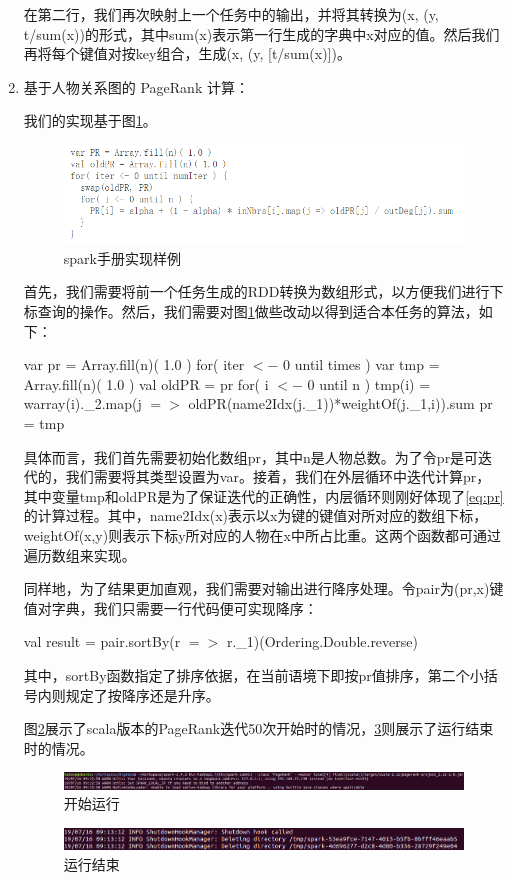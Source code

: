 \documentclass[a4paper,UTF8]{article}
\numberwithin{equation}{section}
\begin{document}
\begin{enumerate}[ {(}1{)}]
		在第二行，我们再次映射上一个任务中的输出，并将其转换为(x, (y, t/sum(x))的形式，其中sum(x)表示第一行生成的字典中x对应的值。然后我们再将每个键值对按key组合，生成(x, (y, [t/sum(x)])。
		\item 基于人物关系图的 PageRank 计算：
		
		我们的实现基于图\ref{fig:code}。
		\begin{figure}
			\centering
			\includegraphics[width=0.7\linewidth]{graph/STask4Code}
			\caption[6]{spark手册实现样例}
			\label{fig:code}
		\end{figure}
		首先，我们需要将前一个任务生成的RDD转换为数组形式，以方便我们进行下标查询的操作。然后，我们需要对图\ref{fig:code}做些改动以得到适合本任务的算法，如下：
		\begin{center}
			var pr = Array.fill(n)( 1.0 )
			for( iter $<-$ 0 until times ) {
				var tmp = Array.fill(n)( 1.0 )
				val oldPR = pr
				for( i $<-$ 0 until n ) 
					tmp(i) = warray(i).\_2.map(j $=>$ oldPR(name2Idx(j.\_1))*weightOf(j.\_1,i)).sum
				pr = tmp
			}
		\end{center}
		具体而言，我们首先需要初始化数组pr，其中n是人物总数。为了令pr是可迭代的，我们需要将其类型设置为var。接着，我们在外层循环中迭代计算pr，其中变量tmp和oldPR是为了保证迭代的正确性，内层循环则刚好体现了\ref{eq:pr}的计算过程。其中，name2Idx(x)表示以x为键的键值对所对应的数组下标，weightOf(x,y)则表示下标y所对应的人物在x中所占比重。这两个函数都可通过遍历数组来实现。
		
		同样地，为了结果更加直观，我们需要对输出进行降序处理。令pair为(pr,x)键值对字典，我们只需要一行代码便可实现降序：
		\begin{center}
			val result = pair.sortBy(r $=>$ r.\_1)(Ordering.Double.reverse)
		\end{center}
		其中，sortBy函数指定了排序依据，在当前语境下即按pr值排序，第二个小括号内则规定了按降序还是升序。
		
		图\ref{fig:stask4runs}展示了scala版本的PageRank迭代50次开始时的情况，\ref{fig:stask4rune}则展示了运行结束时的情况。
		\begin{figure}
			\centering
			\includegraphics[width=0.7\linewidth]{graph/STask4RunS}
			\caption[7]{开始运行}
			\label{fig:stask4runs}
		\end{figure}
		\begin{figure}
			\centering
			\includegraphics[width=0.7\linewidth]{graph/STask4RunE}
			\caption[8]{运行结束}
			\label{fig:stask4rune}
		\end{figure}
		

\end{enumerate}
\end{document}
